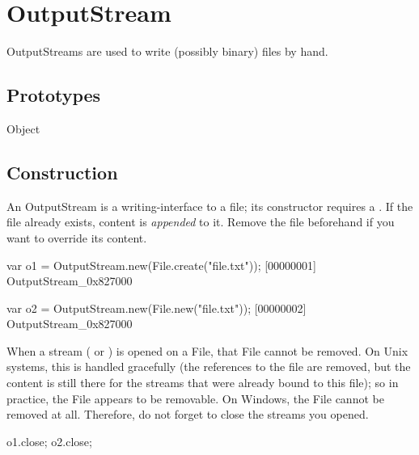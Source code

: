 
\section{OutputStream}

OutputStreams are used to write (possibly binary) files by hand.

\subsection{Prototypes}
\begin{refObjects}
\item[Object]
\end{refObjects}

\subsection{Construction}
\label{sec:specs:OutputStream:ctor}

An OutputStream is a writing-interface to a file; its constructor
requires a .  If the file already exists, content is
\emph{appended} to it.  Remove the file beforehand if you want to
override its content.

\begin{urbiscript}
var o1 = OutputStream.new(File.create("file.txt"));
[00000001] OutputStream_0x827000

var o2 = OutputStream.new(File.new("file.txt"));
[00000002] OutputStream_0x827000
\end{urbiscript}

When a stream ( or ) is
opened on a File, that File cannot be removed.  On Unix systems, this is
handled gracefully (the references to the file are removed, but the content
is still there for the streams that were already bound to this file); so in
practice, the File appears to be removable.  On Windows, the File cannot be
removed at all.  Therefore, do not forget to close the streams you opened.

\begin{urbiscript}
o1.close;
o2.close;
\end{urbiscript}

